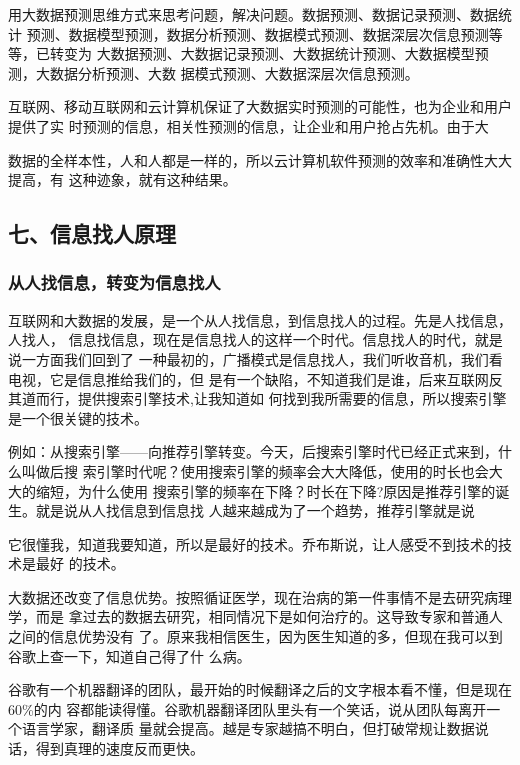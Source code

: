 \documentclass[11pt]{ctexart}
\begin{document}
{{{{用大数据预测思维方式来思考问题，解决问题。数据预测、数据记录预测、数据统计
预测、数据模型预测，数据分析预测、数据模式预测、数据深层次信息预测等等，已转变为
大数据预测、大数据记录预测、大数据统计预测、大数据模型预测，大数据分析预测、大数
据模式预测、大数据深层次信息预测。

互联网、移动互联网和云计算机保证了大数据实时预测的可能性，也为企业和用户提供了实
时预测的信息，相关性预测的信息，让企业和用户抢占先机。由于大


数据的全样本性，人和人都是一样的，所以云计算机软件预测的效率和准确性大大提高，有
这种迹象，就有这种结果。

\subsection{七、信息找人原理}
\label{sec:org9f92909}

\subsubsection{从人找信息，转变为信息找人}
\label{sec:org1657c1f}

互联网和大数据的发展，是一个从人找信息，到信息找人的过程。先是人找信息，人找人，
信息找信息，现在是信息找人的这样一个时代。信息找人的时代，就是说一方面我们回到了
一种最初的，广播模式是信息找人，我们听收音机，我们看电视，它是信息推给我们的，但
是有一个缺陷，不知道我们是谁，后来互联网反其道而行，提供搜索引擎技术,让我知道如
何找到我所需要的信息，所以搜索引擎是一个很关键的技术。

例如：从搜索引擎——向推荐引擎转变。今天，后搜索引擎时代已经正式来到，什么叫做后搜
索引擎时代呢？使用搜索引擎的频率会大大降低，使用的时长也会大大的缩短，为什么使用
搜索引擎的频率在下降？时长在下降?原因是推荐引擎的诞生。就是说从人找信息到信息找
人越来越成为了一个趋势，推荐引擎就是说

它很懂我，知道我要知道，所以是最好的技术。乔布斯说，让人感受不到技术的技术是最好
的技术。

大数据还改变了信息优势。按照循证医学，现在治病的第一件事情不是去研究病理学，而是
拿过去的数据去研究，相同情况下是如何治疗的。这导致专家和普通人之间的信息优势没有
了。原来我相信医生，因为医生知道的多，但现在我可以到谷歌上查一下，知道自己得了什
么病。

谷歌有一个机器翻译的团队，最开始的时候翻译之后的文字根本看不懂，但是现在60\%的内
容都能读得懂。谷歌机器翻译团队里头有一个笑话，说从团队每离开一个语言学家，翻译质
量就会提高。越是专家越搞不明白，但打破常规让数据说话，得到真理的速度反而更快。

}}}}
\end{document}
